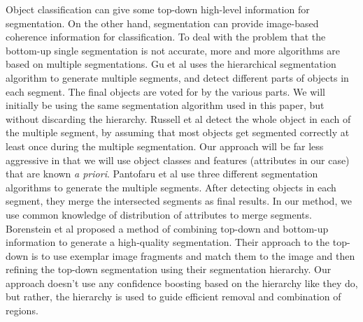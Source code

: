 \documentclass[10pt,twocolumn,letterpaper]{article}
\begin{document}
Object classification can give some top-down high-level information
for segmentation. On the other hand, segmentation can provide
image-based coherence information for classification. To deal with
the problem that the bottom-up single segmentation is not accurate,
more and more algorithms are based on multiple segmentations. Gu et
al \cite{gu09} uses the hierarchical segmentation algorithm to
generate multiple segments, and detect different parts of objects in
each segment. The final objects are voted for by the various parts.
We will initially be using the same segmentation algorithm used in
this paper, but without discarding the hierarchy.
Russell et al \cite{russell06} detect the whole object in each of
the multiple segment, by assuming that most objects get segmented
correctly at least once during the multiple segmentation. Our approach
will be far less aggressive in that we will use object classes and
features (attributes in our case) that are known \emph{a priori}.
Pantofaru et
al \cite{pantofaru} use three different segmentation algorithms to
generate the multiple segments. After detecting objects in each
segment, they merge the intersected segments as final results. In
our method, we use common knowledge of distribution of attributes to
merge segments.
Borenstein et al \cite{borenstein04} proposed a method of combining top-down
and bottom-up information to generate a high-quality segmentation.  Their
approach to the top-down is to use exemplar image fragments and match them
to the image and then refining the top-down segmentation using their
segmentation hierarchy.  Our approach doesn't use any confidence boosting based
on the hierarchy like they do, but rather, the hierarchy is used to guide
efficient removal and combination of regions.

\end{document}
